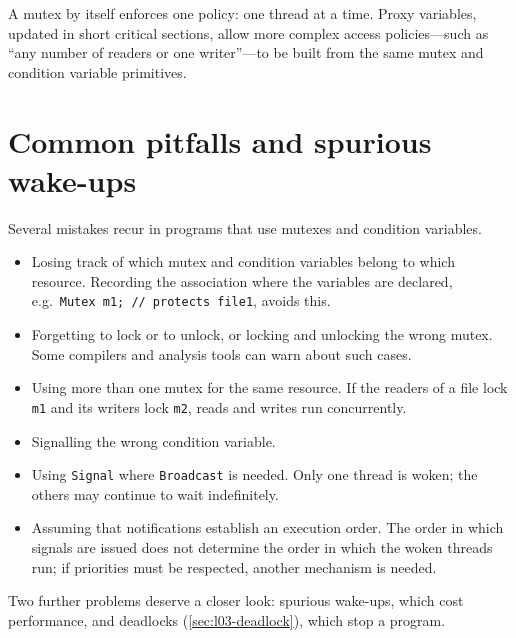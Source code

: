 \documentclass[../main.tex]{subfiles}
\begin{document}
\begin{keypoint}
  A mutex by itself enforces one policy: one thread at a time.  Proxy
  variables, updated in short critical sections, allow more complex access
  policies---such as \enquote{any number of readers or one writer}---to be
  built from the same mutex and condition variable primitives.
\end{keypoint}

\section{Common pitfalls and spurious wake-ups}
\label{sec:l03-pitfalls}

Several mistakes recur in programs that use mutexes and condition
variables.
\begin{itemize}
  \item Losing track of which mutex and condition variables belong to which
    resource.  Recording the association where the variables are declared,
    e.g.\ \texttt{Mutex m1; // protects file1}, avoids this.
  \item Forgetting to lock or to unlock, or locking and unlocking the wrong
    mutex.  Some compilers and analysis tools can warn about such
    cases.
  \item Using more than one mutex for the same resource.  If the readers of
    a file lock \texttt{m1} and its writers lock \texttt{m2}, reads and
    writes run concurrently.
  \item Signalling the wrong condition variable.
  \item Using \texttt{Signal} where \texttt{Broadcast} is needed.  Only one
    thread is woken; the others may continue to wait indefinitely.
  \item Assuming that notifications establish an execution order.  The
    order in which signals are issued does not determine the order in
    which the woken threads run; if priorities must be respected, another
    mechanism is needed.
\end{itemize}

Two further problems deserve a closer look: spurious wake-ups, which cost
performance, and deadlocks (\cref{sec:l03-deadlock}), which stop a program.
\end{document}
